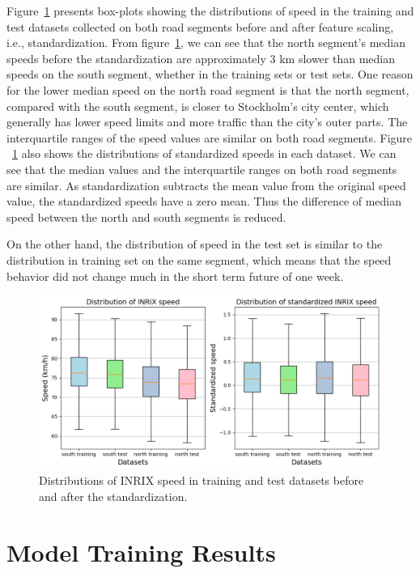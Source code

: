 \documentclass[english]{kththesis}
\begin{document}
Figure~\ref{fig:standardization_boxplots} presents box-plots showing the distributions of speed in the training and test datasets collected on both road segments before and after feature scaling, i.e., standardization. From figure~\ref{fig:standardization_boxplots}, we can see that the north segment's median speeds before the standardization are approximately 3 km slower than median speeds on the south segment, whether in the training sets or test sets. One reason for the lower median speed on the north road segment is that the north segment, compared with the south segment, is closer to Stockholm's city center, which generally has lower speed limits and more traffic than the city's outer parts. The interquartile ranges of the speed values are similar on both road segments. Figure ~\ref{fig:standardization_boxplots} also shows the distributions of standardized speeds in each dataset. We can see that the median values and the interquartile ranges on both road segments are similar. As standardization subtracts the mean value from the original speed value, the standardized speeds have a zero mean. Thus the difference of median speed between the north and south segments is reduced. 

On the other hand, the distribution of speed in the test set is similar to the distribution in training set on the same segment, which means that the speed behavior did not change much in the short term future of one week.

\begin{figure}[!ht]
    \centering
    \includegraphics[width=\textwidth]{standardization_boxplots.png}
    \caption{Distributions of INRIX speed in training and test datasets before and after the standardization.}
    \label{fig:standardization_boxplots}
\end{figure}

\section{Model Training Results}
\label{sec:modelTrainingResults}
\end{document}
